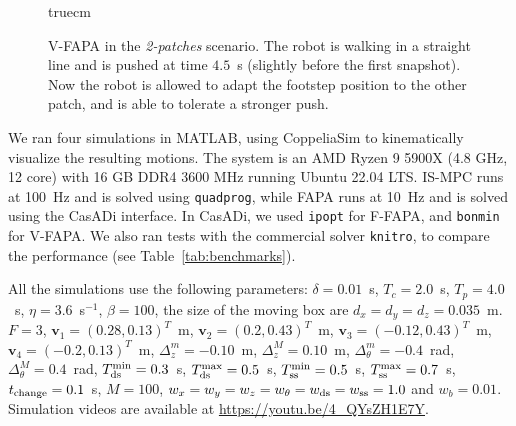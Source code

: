 \begin{figure}
    \caption{V-FAPA in the {\em 2-patches} scenario. The robot is walking in a straight line and is pushed at time $4.5$~s (slightly before the first snapshot). Now the robot is allowed to adapt the footstep position to the other patch, and is able to tolerate a stronger push.}
    \label{fig:FAPA:matlab_2pacmi}
     truecm
\end{figure}




We ran four simulations in MATLAB, using CoppeliaSim to kinematically visualize the resulting motions. The system is an AMD Ryzen 9 5900X (4.8 GHz, 12 core) with 16 GB DDR4 3600 MHz running Ubuntu 22.04 LTS. IS-MPC runs at 100~Hz and is solved using \texttt{quadprog}, while FAPA runs at 10~Hz and is solved using the CasADi interface. In CasADi, we used \texttt{ipopt} for F-FAPA, and \texttt{bonmin} for V-FAPA. We also ran tests with the commercial solver \texttt{knitro}, to compare the performance (see Table~\ref{tab:benchmarks}).

All the simulations use the following parameters: $\delta=0.01$~s, $T_c=2.0$~s, $T_p=4.0$~s, $\eta=3.6$~s$^{-1}$, $\beta = 100$, the size of the moving box are $d_x = d_y = d_z = 0.035$~m. $F=3$, $\bm{v}_1=(0.28, 0.13)^T $~m, $\bm{v}_2=(0.2, 0.43)^T$~m, $\bm{v}_3=(-0.12, 0.43)^T$~m, $\bm{v}_4=(-0.2, 0.13)^T$~m, $\Delta_z^m=-0.10$~m, $\Delta_z^M=0.10$~m, $\Delta_{\theta}^m=-0.4$~rad, $\Delta_{\theta}^M=0.4$~rad, $T_{\rm ds}^{\min}=0.3 $~s, $T_{\rm ds}^{\max}=0.5$~s, $T_{\rm ss}^{\min}=0.5$~s, $T_{\rm ss}^{\max}=0.7$~s, $t_{\rm change}=0.1$~s, $M=100$, $w_x=w_y=w_z=w_{\theta}=w_{\rm ds}=w_{\rm ss}=1.0$ and $w_b=0.01$. Simulation videos are available at \url{https://youtu.be/4_QYsZH1E7Y}.%

